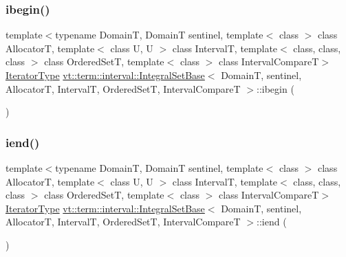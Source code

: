 \mbox{\label{structvt_1_1term_1_1interval_1_1_integral_set_base_a3e9dc82d28ecca2c84edac4c80e6c433}} 
\subsubsection{\texorpdfstring{ibegin()}{ibegin()}}
{\footnotesize\ttfamily template$<$typename DomainT, DomainT sentinel, template$<$ class $>$ class AllocatorT, template$<$ class U, U $>$ class IntervalT, template$<$ class, class, class $>$ class Ordered\+SetT, template$<$ class $>$ class Interval\+CompareT$>$ \\
\hyperlink{structvt_1_1term_1_1interval_1_1_integral_set_base_a111b2ec1ea960a40ba4270be702f11f1}{Iterator\+Type} \hyperlink{structvt_1_1term_1_1interval_1_1_integral_set_base}{vt\+::term\+::interval\+::\+Integral\+Set\+Base}$<$ DomainT, sentinel, AllocatorT, IntervalT, Ordered\+SetT, Interval\+CompareT $>$\+::ibegin (\begin{DoxyParamCaption}{ }\end{DoxyParamCaption})\hspace{0.3cm}{\ttfamily [inline]}}

\mbox{\label{structvt_1_1term_1_1interval_1_1_integral_set_base_a34c4b2af7847cae15a7827fe8b578d1b}} 
\subsubsection{\texorpdfstring{iend()}{iend()}}
{\footnotesize\ttfamily template$<$typename DomainT, DomainT sentinel, template$<$ class $>$ class AllocatorT, template$<$ class U, U $>$ class IntervalT, template$<$ class, class, class $>$ class Ordered\+SetT, template$<$ class $>$ class Interval\+CompareT$>$ \\
\hyperlink{structvt_1_1term_1_1interval_1_1_integral_set_base_a111b2ec1ea960a40ba4270be702f11f1}{Iterator\+Type} \hyperlink{structvt_1_1term_1_1interval_1_1_integral_set_base}{vt\+::term\+::interval\+::\+Integral\+Set\+Base}$<$ DomainT, sentinel, AllocatorT, IntervalT, Ordered\+SetT, Interval\+CompareT $>$\+::iend (\begin{DoxyParamCaption}{ }\end{DoxyParamCaption})\hspace{0.3cm}{\ttfamily [inline]}}

